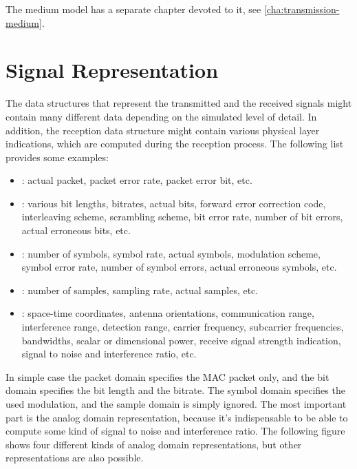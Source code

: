 The medium model has a separate chapter devoted to it, see \ref{cha:transmission-medium}. 

\section{Signal Representation}

The data structures that represent the transmitted and the received signals
might contain many different data depending on the simulated level of detail. In
addition, the reception data structure might contain various physical layer
indications, which are computed during the reception process. The following list
provides some examples:

\begin{itemize}
  \item {}: actual packet, packet error rate, packet error bit,
etc.
  \item {}: various bit lengths, bitrates, actual bits, forward
error correction code, interleaving scheme, scrambling scheme, bit error rate,
number of bit errors, actual erroneous bits, etc.
  \item {}: number of symbols, symbol rate, actual symbols,
modulation scheme, symbol error rate, number of symbol errors, actual erroneous
symbols, etc.
  \item {}: number of samples, sampling rate, actual samples,
etc.
  \item {}: space-time coordinates, antenna orientations,
communication range, interference range, detection range, carrier frequency,
subcarrier frequencies, bandwidths, scalar or dimensional power, receive signal
strength indication, signal to noise and interference ratio, etc.
\end{itemize}

In simple case the packet domain specifies the MAC packet only, and the bit
domain specifies the bit length and the bitrate. The symbol domain specifies the
used modulation, and the sample domain is simply ignored. The most important
part is the analog domain representation, because it's indispensable to be able
to compute some kind of signal to noise and interference ratio. The following
figure shows four different kinds of analog domain representations, but other
representations are also possible.

